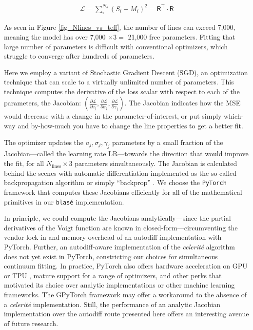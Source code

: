 \documentclass[modern]{aastex631}
\begin{document}
\begin{eqnarray}
    \mathcal{L} = \sum_i^{N_s} (S_i - M_i)^2 = \mathsf{R^\intercal}\cdot \mathsf{R}
\end{eqnarray}


As seen in Figure \ref{fig_Nlines_vs_teff}, the number of lines can exceed 7,000, meaning the model has over 7,000 $\times 3 =$ 21,000 free parameters. Fitting that large number of parameters is difficult with conventional optimizers, which struggle to converge after hundreds of parameters.

Here we employ a variant of Stochastic Gradient Descent (SGD), an optimization technique that can scale to a virtually unlimited number of parameters. This technique computes the derivative of the loss scalar with respect to each of the parameters, the Jacobian: $(\frac{\partial \mathcal{L}}{\partial a_j}, \frac{\partial \mathcal{L}}{\partial \sigma_j}, \frac{\partial \mathcal{L}}{\partial \gamma_j})$. The Jacobian indicates how the MSE would decrease with a change in the parameter-of-interest, or put simply which-way and by-how-much you have to change the line properties to get a better fit.

The optimizer updates the $a_j, \sigma_j, \gamma_j$ parameters by a small fraction of the Jacobian---called the learning rate LR---towards the direction that would improve the fit, for all $N_{\mathrm{lines}} \times 3$ parameters simultaneously. The Jacobian is calculated behind the scenes with automatic differentiation implemented as the so-called backpropagation algorithm or simply ``backprop'' \citep{2015arXiv150205767G}. We choose the \texttt{PyTorch} framework that computes these Jacobians efficiently for all of the mathematical primitives in our \texttt{blas\'e} implementation.

In principle, we could compute the Jacobians analytically---since the partial derivatives of the Voigt function are known in closed-form---circumventing the vendor lock-in and memory overhead of an autodiff implementation with PyTorch. Further, an autodiff-aware implementation of the \emph{celerit\'e} algorithm \citep{2017AJ....154..220F} does not yet exist in PyTorch, constricting our choices for simultaneous continuum fitting. In practice, PyTorch also offers hardware acceleration on GPU or TPU \citep{10.1145/3079856.3080246}, mature support for a range of optimizers, and other perks that motivated its choice over analytic implementations or other machine learning frameworks. The GPyTorch framework \citep{2018arXiv180911165G} may offer a workaround to the absence of a \emph{celerit\'e} implementation. Still, the performance of an analytic Jacobian implementation over the autodiff route presented here offers an interesting avenue of future research.
\end{document}
